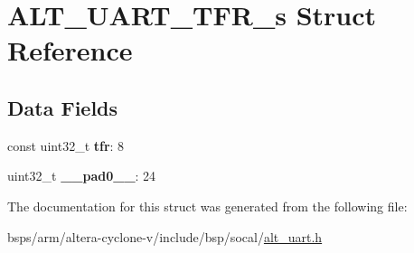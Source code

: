 \hypertarget{structALT__UART__TFR__s}{}\section{A\+L\+T\+\_\+\+U\+A\+R\+T\+\_\+\+T\+F\+R\+\_\+s Struct Reference}
\label{structALT__UART__TFR__s}
\subsection*{Data Fields}
\begin{DoxyCompactItemize}
\item 
\mbox{\label{structALT__UART__TFR__s_aad88051b4baaec819af3737d4c78af17}} 
const uint32\+\_\+t {\bfseries tfr}\+: 8
\item 
\mbox{\label{structALT__UART__TFR__s_a7440aa00aeae8f83d363ae49aca875a6}} 
uint32\+\_\+t {\bfseries \+\_\+\+\_\+pad0\+\_\+\+\_\+}\+: 24
\end{DoxyCompactItemize}


The documentation for this struct was generated from the following file\+:\begin{DoxyCompactItemize}
\item 
bsps/arm/altera-\/cyclone-\/v/include/bsp/socal/\mbox{\hyperlink{alt__uart_8h}{alt\+\_\+uart.\+h}}\end{DoxyCompactItemize}
